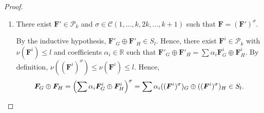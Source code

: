 \documentclass[10pt,a4paper]{amsart}
\newcommand{\cyclicpermutations}{\mathscr{C}(1,\dots, k, 2k, \dots, k+1)}
\begin{document}
\begin{proof}
\begin{enumerate}
		\item There exist $\boldsymbol{F}' \in \mathcal{P}_k$ and $\sigma \in \cyclicpermutations$ such that $\boldsymbol{F} = (\boldsymbol{F}')^\sigma$.
		
		By the inductive hypothesis, $\boldsymbol{F}'_G \oplus \boldsymbol{F}'_H \in S_l$.
		Hence, there exist $\boldsymbol{F}^i \in \mathcal{P}_k$ with $\nu(\boldsymbol{F}^i) \leq l$ and coefficients $\alpha_i \in \mathbb{R}$ such that $\boldsymbol{F}'_G \oplus \boldsymbol{F}'_H  = \sum \alpha_i \boldsymbol{F}^i_G \oplus \boldsymbol{F}^i_H$.
		By definition, $\nu((\boldsymbol{F}^i)^\sigma) \leq \nu(\boldsymbol{F}^i) \leq l$.
		Hence,
		\[
		\boldsymbol{F}_G \oplus \boldsymbol{F}_H = \left( \sum \alpha_i \boldsymbol{F}^i_G \oplus \boldsymbol{F}^i_H \right)^\sigma
		= \sum \alpha_i ((\boldsymbol{F}^i)^\sigma)_G \oplus ((\boldsymbol{F}^i)^\sigma)_H
		\in S_l. \qedhere
		\] 
	\end{enumerate} 
\end{proof}
\end{document}
